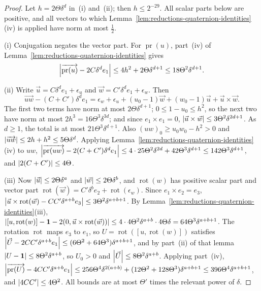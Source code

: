 \begin{proof}
Let $h=2\Theta\delta^d$ in~(i) and~(ii); then $h\le2^{-29}$. All scalar parts
below are positive, and all vectors to which
Lemma~\ref{lem:reductions-quaternion-identities}(iv) is applied have norm at
most $\frac12$.

(i) Conjugation negates the vector part. For $\operatorname{pr}(u)$, part~(iv) of
Lemma~\ref{lem:reductions-quaternion-identities} gives
\[
 \left\lvert\overrightarrow{\operatorname{pr}(u)}-2C\delta^de_1\right\rvert
 \le4h^2+2\Theta\delta^{d+1}\le18\Theta^2\delta^{d+1}.
\]

(ii) Write $\vec u=C\delta^de_1+\epsilon_u$ and $\vec w=C'\delta^de_1+\epsilon_w$.
Then
\[
 \overrightarrow{uw}-(C+C')\delta^de_1=\epsilon_w+\epsilon_u+(u_0-1)\vec w
 +(w_0-1)\vec u+\vec u\times\vec w.
\]
The first two terms have norm at most $2\Theta\delta^{d+1}$; $0\le1-u_0\le h^2$,
so the next two have norm at most $2h^3=16\Theta^3\delta^{3d}$; and since
$e_1\times e_1=0$, $\left\lvert\vec u\times\vec w\right\rvert\le3\Theta^2\delta^{2d+1}$. As $d\ge1$, the
total is at most $21\Theta^3\delta^{d+1}$. Also $(uw)_0\ge u_0w_0-h^2>0$ and
$\left\lvert\overrightarrow{uw}\right\rvert\le2h+h^2\le5\Theta\delta^d$. Applying
Lemma~\ref{lem:reductions-quaternion-identities}(iv) to $uw$,
$\left\lvert\overrightarrow{\operatorname{pr}(uw)}-2(C+C')\delta^de_1\right\rvert\le4\cdot25\Theta^2\delta^{2d}+
42\Theta^3\delta^{d+1}\le142\Theta^3\delta^{d+1}$, and $\left\lvert2(C+C')\right\rvert\le4\Theta$.

(iii) Now $\left\lvert\vec u\right\rvert\le2\Theta\delta^a$ and $\left\lvert\vec w\right\rvert\le2\Theta\delta^b$, and
$\operatorname{rot}(w)$ has positive scalar part and vector part $\operatorname{rot}(\vec w)=C'\delta^be_2+\operatorname{rot}(\epsilon_w)$.
Since $e_1\times e_2=e_3$,
$\left\lvert\vec u\times\operatorname{rot}(\vec w)-CC'\delta^{a+b}e_3\right\rvert\le3\Theta^2\delta^{a+b+1}$. By
Lemma~\ref{lem:reductions-quaternion-identities}(iii),
$\left\lvert[u,\operatorname{rot}(w)]-\mathbf1-2(0,\vec u\times\operatorname{rot}(\vec w))\right\rvert\le4\cdot4\Theta^2\delta^{a+b}
\cdot4\Theta\delta=64\Theta^3\delta^{a+b+1}$. The rotation $\operatorname{rot}$ maps $e_3$ to $e_1$,
so $U=\operatorname{rot}([u,\operatorname{rot}(w)])$ satisfies
$\left\lvert\vec U-2CC'\delta^{a+b}e_1\right\rvert\le(6\Theta^2+64\Theta^3)\delta^{a+b+1}$, and by
part~(ii) of that lemma $\left\lvert U-\mathbf1\right\rvert\le8\Theta^2\delta^{a+b}$, so
$U_0>0$ and $\left\lvert\vec U\right\rvert\le8\Theta^2\delta^{a+b}$. Applying part~(iv),
$\left\lvert\overrightarrow{\operatorname{pr}(U)}-4CC'\delta^{a+b}e_1\right\rvert\le256\Theta^4\delta^{2(a+b)}
+(12\Theta^2+128\Theta^3)\delta^{a+b+1}\le396\Theta^4\delta^{a+b+1}$, and
$\left\lvert4CC'\right\rvert\le4\Theta^2$. All bounds are at most $\Theta'$ times the relevant
power of $\delta$.
\end{proof}


